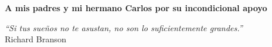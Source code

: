 \thispagestyle{empty}

\begin{flushright}

  \vspace*{\fill}
  \textbf{A mis padres y mi hermano Carlos por su incondicional apoyo}\\

  \vspace{3cm}

  \emph{``Si tus sueños no te asustan, no son lo suficientemente grandes.''}\\ Richard Branson

\end{flushright}  

\vspace{4cm}
\vspace*{\fill}